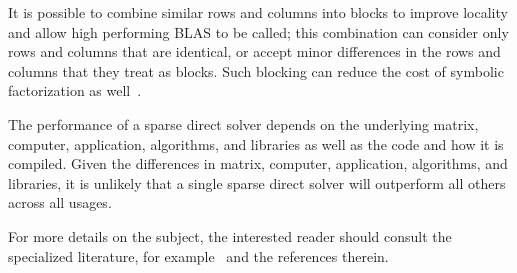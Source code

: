 \documentclass[acmtocl]{acmtrans2m}
\begin{document}
It is possible to combine similar rows and columns into blocks to improve
locality and allow high performing BLAS to be called; this combination can
consider only rows and columns that are identical, or accept minor differences
in the rows and columns that they treat as blocks.  Such blocking can reduce
the cost of symbolic factorization as well~\cite{amestoy01analysis}.

The performance of a sparse direct solver depends on the underlying
matrix, computer, application, algorithms, and libraries as well as
the code and how it is compiled.  
Given the differences in matrix, computer, application, algorithms,
and libraries, it is unlikely that a single sparse direct solver will 
outperform all others across all usages.  

For more details on the subject, the interested reader should
consult the specialized literature, for
example~\cite{duff86direct,duff97sparse} and the references therein. 


\end{document}
